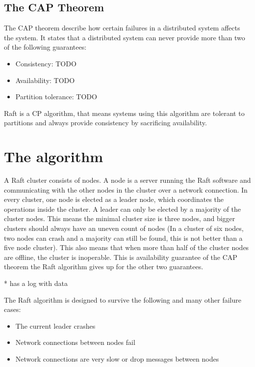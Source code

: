 \subsection{The CAP Theorem}

The CAP theorem describe how certain failures in a distributed system affects the system. It states that a distributed system can never provide more than two of the following guarantees:

\begin{itemize}
    \item Consistency: TODO
    \item Availability: TODO
    \item Partition tolerance: TODO
\end{itemize}

Raft is a CP algorithm, that means systems using this algorithm are tolerant to partitions and always provide consistency by sacrificing availability. 

\section{The algorithm}
A Raft cluster consists of nodes. A node is a server running the Raft software and communicating with the other nodes in the cluster over a network connection.
In every cluster, one node is elected as a leader node, which coordinates the operations inside the cluster. A leader can only be elected by
a majority of the cluster nodes. This means the minimal cluster size is three nodes, and bigger clusters should always have an uneven count of nodes (In a cluster
of six nodes, two nodes can crash and a majority can still be found, this is not better than a five node cluster).
This also means that when more than half of the cluster nodes are offline, the cluster is inoperable. This is availability guarantee of the CAP theorem the Raft algorithm gives up
for the other two guarantees. 

* has a log with data

The Raft algorithm is designed to survive the following and many other failure cases:
\begin{itemize}
    \item The current leader crashes
    \item Network connections between nodes fail
    \item Network connections are very slow or drop messages between nodes
\end{itemize}

